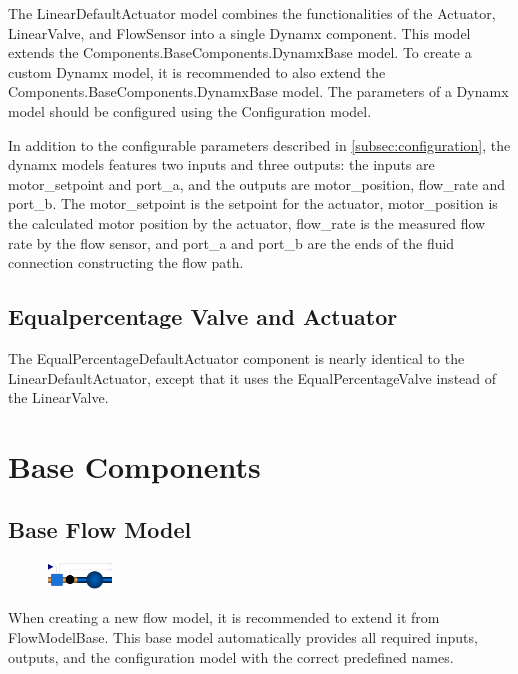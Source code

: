 \documentclass[we,final,11pt,oneside,openany]{uantwerpenbamathesis}
\begin{document}
The LinearDefaultActuator model combines the functionalities of the Actuator, LinearValve, and FlowSensor into a single Dynamx component.
This model extends the Components.BaseComponents.DynamxBase model.
To create a custom Dynamx model, it is recommended to also extend the Components.BaseComponents.DynamxBase model.
The parameters of a Dynamx model should be configured using the Configuration model.

In addition to the configurable parameters described in \autoref{subsec:configuration}, the dynamx models features two inputs and three outputs: the inputs are motor\_setpoint and port\_a, and the outputs are motor\_position, flow\_rate and port\_b.
The motor\_setpoint is the setpoint for the actuator, motor\_position is the calculated motor position by the actuator, flow\_rate is the measured flow rate by the flow sensor, and port\_a and port\_b are the ends of the fluid connection constructing the flow path.

\subsection{Equalpercentage Valve and Actuator}
\label{subsec:equalpercentage-valve-and-actuator}

The EqualPercentageDefaultActuator component is nearly identical to the LinearDefaultActuator, except that it uses the EqualPercentageValve instead of the LinearValve.

\section{Base Components}
\label{sec:base-components}

\subsection{Base Flow Model}
\label{subsec:base-flowmodel}

\begin{figure}
    \centering
    \includegraphics[width=0.15\textwidth]{Images/components/flow-model-base}
\end{figure}

When creating a new flow model, it is recommended to extend it from FlowModelBase.
This base model automatically provides all required inputs, outputs, and the configuration model with the correct predefined names.
\end{document}
